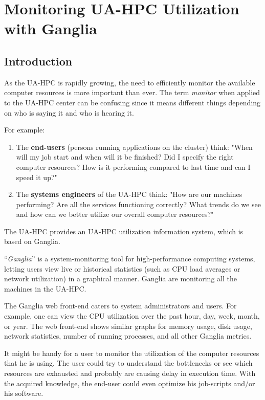 \chapter{Monitoring UA-HPC Utilization with Ganglia}

\section{Introduction}

As the UA-HPC is rapidly growing, the need to efficiently monitor the available computer resources is more important than ever. The term \textit{monitor} when applied to the UA-HPC center can be confusing since it means different things depending on who is saying it and who is hearing it.

For example:

\begin{enumerate}
\item  The \textbf{end-users} (persons running applications on the cluster) think: "When will my job start and when will it be finished? Did I specify the right computer resources?  How is it performing compared to last time and can I speed it up?"
\item  The \textbf{systems engineers} of the UA-HPC think: "How are our machines performing? Are all the services functioning correctly? What trends do we see and how can we better utilize our overall computer resources?"
\end{enumerate}

The UA-HPC provides an UA-HPC utilization information system, which is based on Ganglia.

``\textit{Ganglia}'' is a system-monitoring tool for high-performance computing systems, letting users view live or historical statistics (such as CPU load averages or network utilization) in a graphical manner. Ganglia are monitoring all the machines in the UA-HPC.

The Ganglia web front-end caters to system administrators and users. For example, one can view the CPU utilization over the past hour, day, week, month, or year. The web front-end shows similar graphs for memory usage, disk usage, network statistics, number of running processes, and all other Ganglia metrics.

It might be handy for a user to monitor the utilization of the computer resources that he is using. The user could try to understand the bottlenecks or see which resources are exhausted and probably are causing delay in execution time. With the acquired knowledge, the end-user could even optimize his job-scripts and/or his software.

